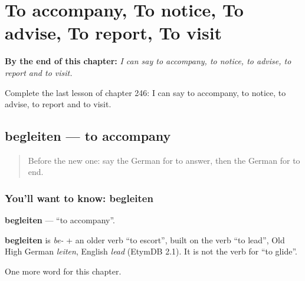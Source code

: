 
\chapter{To accompany, To notice, To advise, To report, To visit}
\label{ch:ge-to-accompany-to-notice-to-advise-to-report-to-visit}

\begin{chapteropening}
\textbf{By the end of this chapter:} \emph{I can say to accompany, to notice, to advise, to report and to visit.}

Complete the last lesson of chapter 246: I can say to accompany, to notice, to advise, to report and to visit.
\end{chapteropening}

\section[begleiten]{begleiten — to accompany}

\label{lesson:GE-C246-begleiten}



\begin{quote}
Before the new one: say the German for to answer, then the German for to end.
\end{quote}

\subsection*{You'll want to know: begleiten}
\textbf{begleiten} — \textquotedblleft{}to accompany\textquotedblright{}.

\begin{cousinweb}
\textbf{begleiten} is \emph{be-} + an older verb \textquotedblleft{}to escort\textquotedblright{}, built on the verb \textquotedblleft{}to lead\textquotedblright{}, Old High German \emph{leiten}, English \emph{lead} (EtymDB 2.1). It is not the verb for \textquotedblleft{}to glide\textquotedblright{}.
\end{cousinweb}

\begin{grammarlens}[title={What you've built}]
One more word for this chapter.
\end{grammarlens}

